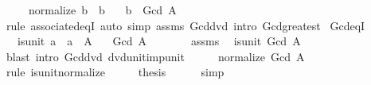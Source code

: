 \begin{isabellebody}
\ \ \ \ \ {\isachardoublequoteopen}normalize\ b\ {\isacharequal}{\kern0pt}\ b{\isachardoublequoteclose}\isanewline
\ \ \ {\isachardoublequoteopen}b\ {\isacharequal}{\kern0pt}\ Gcd\ A{\isachardoublequoteclose}\isanewline
%
\isadelimproof
\ \ %
\endisadelimproof
%
\isatagproof
{}\isamarkupfalse%
\ {\isacharparenleft}{\kern0pt}rule\ associated{\isacharunderscore}{\kern0pt}eqI{\isacharparenright}{\kern0pt}\ {\isacharparenleft}{\kern0pt}auto\ simp{\isacharcolon}{\kern0pt}\ assms\ Gcd{\isacharunderscore}{\kern0pt}dvd\ intro{\isacharcolon}{\kern0pt}\ Gcd{\isacharunderscore}{\kern0pt}greatest{\isacharparenright}{\kern0pt}%
\endisatagproof
{\isafoldproof}%
%
\isadelimproof
\isanewline
%
\endisadelimproof
\isanewline
{}\isamarkupfalse%
\ Gcd{\isacharunderscore}{\kern0pt}eq{\isacharunderscore}{\kern0pt}{}{\isacharunderscore}{\kern0pt}I{\isacharcolon}{\kern0pt}\isanewline
\ \ \ {\isachardoublequoteopen}is{\isacharunderscore}{\kern0pt}unit\ a{\isachardoublequoteclose}\ \ {\isachardoublequoteopen}a\ {\isasymin}\ A{\isachardoublequoteclose}\isanewline
\ \ \ {\isachardoublequoteopen}Gcd\ A\ {\isacharequal}{\kern0pt}\ {}{\isachardoublequoteclose}\isanewline
%
\isadelimproof
%
\endisadelimproof
%
\isatagproof
{}\isamarkupfalse%
\ {\isacharminus}{\kern0pt}\isanewline
\ \ \isamarkupfalse%
\ assms\ \isamarkupfalse%
\ {\isachardoublequoteopen}is{\isacharunderscore}{\kern0pt}unit\ {\isacharparenleft}{\kern0pt}Gcd\ A{\isacharparenright}{\kern0pt}{\isachardoublequoteclose}\isanewline
\ \ \ \ \isamarkupfalse%
\ {\isacharparenleft}{\kern0pt}blast\ intro{\isacharcolon}{\kern0pt}\ Gcd{\isacharunderscore}{\kern0pt}dvd\ dvd{\isacharunderscore}{\kern0pt}unit{\isacharunderscore}{\kern0pt}imp{\isacharunderscore}{\kern0pt}unit{\isacharparenright}{\kern0pt}\isanewline
\ \ \isamarkupfalse%
\ \isamarkupfalse%
\ {\isachardoublequoteopen}normalize\ {\isacharparenleft}{\kern0pt}Gcd\ A{\isacharparenright}{\kern0pt}\ {\isacharequal}{\kern0pt}\ {}{\isachardoublequoteclose}\isanewline
\ \ \ \ \isamarkupfalse%
\ {\isacharparenleft}{\kern0pt}rule\ is{\isacharunderscore}{\kern0pt}unit{\isacharunderscore}{\kern0pt}normalize{\isacharparenright}{\kern0pt}\isanewline
\ \ \isamarkupfalse%
\ \isamarkupfalse%
\ {\isacharquery}{\kern0pt}thesis\isanewline
\ \ \ \ \isamarkupfalse%
\ simp\isanewline
{}\isamarkupfalse%

\end{isabellebody}
